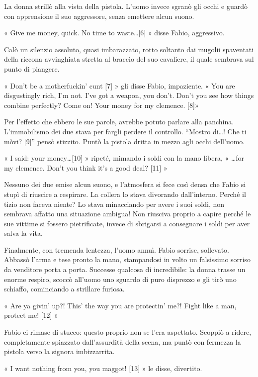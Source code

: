 La donna strillò alla vista della pistola. L'uomo invece sgranò gli occhi e guardò con apprensione il suo aggressore, senza emettere alcun suono.

« Give me money, quick. No time to waste\ldots [6] » disse Fabio, aggressivo.

Calò un silenzio assoluto, quasi imbarazzato, rotto soltanto dai mugolii spaventati della riccona avvinghiata stretta al braccio del suo cavaliere, il quale sembrava sul punto di piangere.

« Don't be a motherfuckin' cunt [7] » gli disse Fabio, impaziente. « You are disgustingly rich, I'm not. I've got a weapon, you don't. Don't you see how things combine perfectly? Come on! Your money for my clemence. [8]»

Per l'effetto che ebbero le sue parole, avrebbe potuto parlare alla panchina. L'immobilismo dei due stava per fargli perdere il controllo. ``Mostro di\ldots! Che ti mòvi? [9]'' pensò stizzito. Puntò la pistola dritta in mezzo agli occhi dell'uomo.

« I said: your money\ldots [10] » ripeté, mimando i soldi con la mano libera, « \ldots for my clemence. Don't you think it's a good deal? [11] »

Nessuno dei due emise alcun suono, e l'atmosfera si fece così densa che Fabio si stupì di riuscire a respirare. La collera lo stava divorando dall'interno. Perché il tizio non faceva niente? Lo stava minacciando per avere i suoi soldi, non sembrava affatto una situazione ambigua! Non riusciva proprio a capire perché le sue vittime si fossero pietrificate, invece di sbrigarsi a consegnare i soldi per aver salva la vita.

Finalmente, con tremenda lentezza, l'uomo annuì. Fabio sorrise, sollevato. Abbassò l'arma e tese pronto la mano, stampandosi in volto un falsissimo sorriso da venditore porta a porta. Successe qualcosa di incredibile: la donna trasse un enorme respiro, scoccò all'uomo uno sguardo di puro disprezzo e gli tirò uno schiaffo, cominciando a strillare furiosa.

« Are ya givin' up?! This' the way you are protectin' me?! Fight like a man, protect me! [12] »

Fabio ci rimase di stucco: questo proprio non se l'era aspettato. Scoppiò a ridere, completamente spiazzato dall'assurdità della scena, ma puntò con fermezza la pistola verso la signora imbizzarrita.

« I want nothing from you, you maggot! [13] » le disse, divertito.

